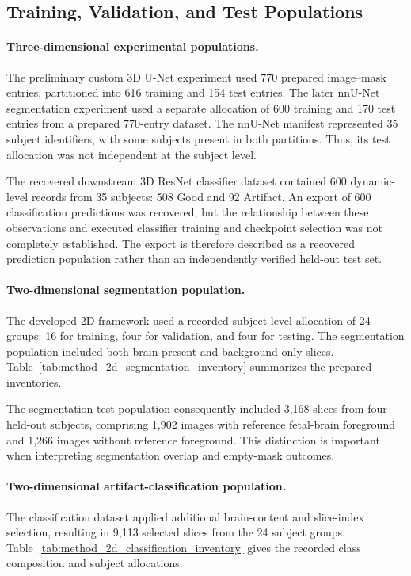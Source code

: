 \subsection{Training, Validation, and Test Populations}
\label{subsec:results_dataset_splits}

\paragraph{Three-dimensional experimental populations.}
The preliminary custom 3D U-Net experiment used 770 prepared image--mask entries, partitioned into 616 training and 154 test entries. The later nnU-Net segmentation experiment used a separate allocation of 600 training and 170 test entries from a prepared 770-entry dataset. The nnU-Net manifest represented 35 subject identifiers, with some subjects present in both partitions. Thus, its test allocation was not independent at the subject level.

The recovered downstream 3D ResNet classifier dataset contained 600 dynamic-level records from 35 subjects: 508 Good and 92 Artifact. An export of 600 classification predictions was recovered, but the relationship between these observations and executed classifier training and checkpoint selection was not completely established. The export is therefore described as a recovered prediction population rather than an independently verified held-out test set.

\paragraph{Two-dimensional segmentation population.}
The developed 2D framework used a recorded subject-level allocation of 24 groups: 16 for training, four for validation, and four for testing. The segmentation population included both brain-present and background-only slices. Table~\ref{tab:method_2d_segmentation_inventory} summarizes the prepared inventories.

The segmentation test population consequently included 3,168 slices from four held-out subjects, comprising 1,902 images with reference fetal-brain foreground and 1,266 images without reference foreground. This distinction is important when interpreting segmentation overlap and empty-mask outcomes.

\paragraph{Two-dimensional artifact-classification population.}
The classification dataset applied additional brain-content and slice-index selection, resulting in 9,113 selected slices from the 24 subject groups. Table~\ref{tab:method_2d_classification_inventory} gives the recorded class composition and subject allocations.


